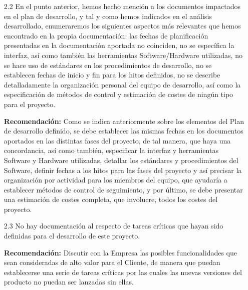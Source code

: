 \documentclass[a4paper,12pt]{report}
\begin{document}
\begin{enumerate}
                \vspace{0.05cm}
            
    \item[2.2] En el punto anterior, hemos hecho mención a los documentos impactados en el plan de desarrollo,
    y tal y como hemos indicados en el análisis desarrollado, enumeraremos los siguientes aspectos más
    relevantes que hemos encontrado en la propia documentación: las fechas de planificación presentadas 
    en la documentación aportada no coinciden, no se específica la interfaz, así como también las 
    herramientas Software/Hardware utilizadas, no se hace uso de estándares en los procedimientos de
    desarrollo, no se establecen fechas de inicio y fin para los hitos definidos, no se describe
    detalladamente la organización  personal del equipo de desarrollo, así como la especificación
    de métodos de control y estimación de costes de ningún tipo para el proyecto. \\
    
    \vspace{0.05cm}
    
    \textbf{Recomendación:} Como se indica anteriormente sobre los elementos del Plan de desarrollo definido,
    se debe establecer las mismas fechas en los documentos aportados en las distintas fases del proyecto, de
    tal manera, que haya una concordancia, así como también, especificar la interfaz y herramientas Software
    y Hardware utilizadas, detallar los estándares y procedimientos del Software, definir fechas a los hitos
    para las fases del proyecto y así precisar la organización por actividad para los miembros del equipo, 
    que ayudaría a establecer métodos de control de seguimiento, y por último, se debe presentar una
    estimación de costes completa, que involucre, todos los costes del proyecto.\\
    
    \vspace{0.05cm}
    
    \item[2.3] No hay documentación al respecto de tareas críticas que hayan 
    sido definidas para el desarrollo de este proyecto.\\
    
    \vspace{0.05cm}
    
    \textbf{Recomendación:} Discutir con la Empresa las posibles funcionalidades
    que sean consideradas de alto valor para el Cliente, de manera que puedan
    establecerse una serie de tareas críticas por las cuales las nuevas 
    versiones del producto no puedan ser lanzadas sin ellas. \\
    

\end{enumerate}
\end{document}
